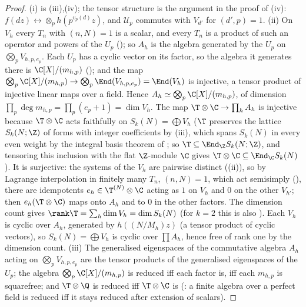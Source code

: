 \begin{proof}
(i) is (iii),(iv); the tensor structure is the argument in the proof of (iv): $f(dz)\leftrightarrow\otimes_ph(p^{v_p(d)}z)$, and $\mathcal U_p$ commutes
with $V_{d'}$ for $(d',p)=1$. (ii) On $V_h$ every $T_n$ with $(n,N)=1$ is a scalar, and every $T_n$ is a product of such an operator and powers of the $U_p$ (); so $A_h$ is
the algebra generated by the $U_p$ on $\bigotimes_pV_{h,p,e_p}$. Each $U_p$ has a cyclic vector on its factor, so the algebra it generates there is $\C[X]/(m_{h,p})$ (); and
the map $\bigotimes_p\C[X]/(m_{h,p})\to\bigotimes_p\End(V_{h,p,e_p})=\End(V_h)$ is injective, a tensor product of injective linear maps over a field. Hence $A_h\simeq\bigotimes_p\C[X]/(m_{h,p})$, of dimension
$\prod_p\deg m_{h,p}=\prod_p(e_p+1)=\dim V_h$. The map $\T\otimes\C\to\prod_hA_h$ is injective because $\T\otimes\C$ acts faithfully on $S_k(N)=\bigoplus V_h$ ($\T$ preserves the lattice $S_k(N;\Z)$ of forms with integer
coefficients by (iii), which spans $S_k(N)$ in every even weight by the integral basis theorem of ; so $\T\subseteq\End_\Z S_k(N;\Z)$, and tensoring this
inclusion with the flat $\Z$-module $\C$ gives $\T\otimes\C\subseteq\End_\C S_k(N)$). It is surjective: the systems of the $V_h$ are pairwise distinct ((ii)), so by Lagrange
interpolation in finitely many $T_n$, $(n,N)=1$, which act semisimply (), there are idempotents $e_h\in\T^{(N)}\otimes\C$ acting as $1$ on $V_h$ and $0$ on the other $V_{h'}$;
then $e_h(\T\otimes\C)$ maps onto $A_h$ and to $0$ in the other factors. The dimension count gives $\rank\T=\sum_h\dim V_h=\dim S_k(N)$ (for $k=2$ this is also
). Each $V_h$ is cyclic over $A_h$, generated by $h((N/M_h)z)$ (a tensor product of cyclic vectors), so $S_k(N)=\bigoplus V_h$ is cyclic over $\prod A_h$, hence free of
rank one by the dimension count. (iii) The generalised eigenspaces of the commutative algebra $A_h$ acting on $\bigotimes_pV_{h,p,e_p}$ are the tensor products of the generalised eigenspaces of
the $U_p$; the algebra $\bigotimes_p\C[X]/(m_{h,p})$ is reduced iff each factor is, iff each $m_{h,p}$ is squarefree; and $\T\otimes\Q$ is reduced iff $\T\otimes\C$ is (: a finite
algebra over a perfect field is reduced iff it stays reduced after extension of scalars).
\end{proof}

